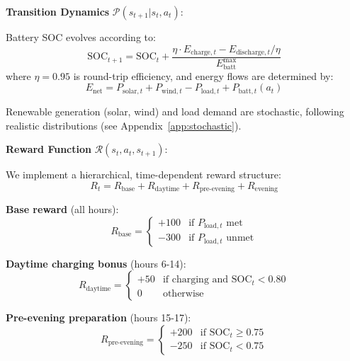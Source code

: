 \documentclass[11pt,a4paper]{article}
\begin{document}
\textbf{Transition Dynamics} $\mathcal{P}(s_{t+1} | s_t, a_t)$:

Battery SOC evolves according to:
\begin{equation}
\text{SOC}_{t+1} = \text{SOC}_t + \frac{\eta \cdot E_{\text{charge},t} - E_{\text{discharge},t}/\eta}{E_{\text{batt}}^{\text{max}}}
\end{equation}
where $\eta = 0.95$ is round-trip efficiency, and energy flows are determined by:
\begin{equation}
E_{\text{net}} = P_{\text{solar},t} + P_{\text{wind},t} - P_{\text{load},t} + P_{\text{batt},t}(a_t)
\end{equation}

Renewable generation (solar, wind) and load demand are stochastic, following realistic distributions (see Appendix~\ref{app:stochastic}).

\textbf{Reward Function} $\mathcal{R}(s_t, a_t, s_{t+1})$:

We implement a hierarchical, time-dependent reward structure:
\begin{equation}
R_t = R_{\text{base}} + R_{\text{daytime}} + R_{\text{pre-evening}} + R_{\text{evening}}
\end{equation}

\textbf{Base reward} (all hours):
\begin{equation}
R_{\text{base}} = \begin{cases}
+100 & \text{if } P_{\text{load},t} \text{ met} \\
-300 & \text{if } P_{\text{load},t} \text{ unmet}
\end{cases}
\end{equation}

\textbf{Daytime charging bonus} (hours 6-14):
\begin{equation}
R_{\text{daytime}} = \begin{cases}
+50 & \text{if charging and } \text{SOC}_t < 0.80 \\
0 & \text{otherwise}
\end{cases}
\end{equation}

\textbf{Pre-evening preparation} (hours 15-17):
\begin{equation}
R_{\text{pre-evening}} = \begin{cases}
+200 & \text{if } \text{SOC}_t \geq 0.75 \\
-250 & \text{if } \text{SOC}_t < 0.75
\end{cases}
\end{equation}
\end{document}
